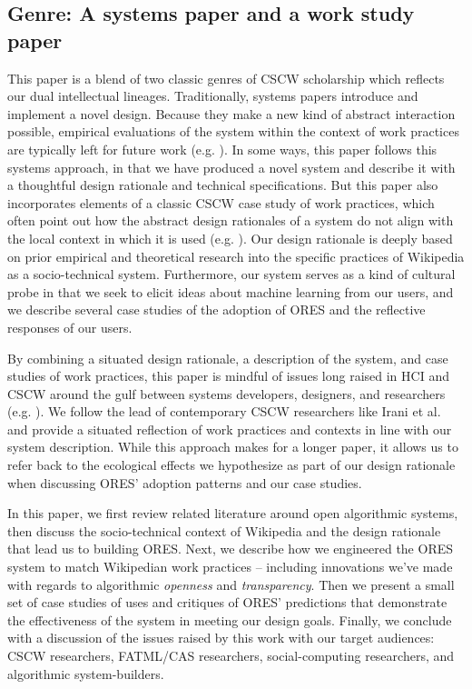 \subsection{Genre: A systems paper and a work study paper}
This paper is a blend of two classic genres of CSCW scholarship which reflects our dual intellectual lineages. Traditionally, systems papers introduce and implement a novel design. Because they make a new kind of abstract interaction possible, empirical evaluations of the system within the context of work practices are typically left for future work (e.g. \cite{resnick1994grouplens}). In some ways, this paper follows this systems approach, in that we have produced a novel system and describe it with a thoughtful design rationale and technical specifications. But this paper also incorporates elements of a classic CSCW case study of work practices, which often point out how the abstract design rationales of a system do not align with the local context in which it is used (e.g. \cite{star1994steps}). Our design rationale is deeply based on prior empirical and theoretical research into the specific practices of Wikipedia as a socio-technical system. Furthermore, our system serves as a kind of cultural probe in that we seek to elicit ideas about machine learning from our users, and we describe several case studies of the adoption of ORES and the reflective responses of our users.

By combining a situated design rationale, a description of the system, and case studies of work practices, this paper is mindful of issues long raised in HCI and CSCW around the gulf between systems developers, designers, and researchers (e.g. \cite{gentner1990good, dourish2006implications, grudin1988cscw}). We follow the lead of contemporary CSCW researchers like Irani et al.\cite{irani2013turkopticon} and provide a situated reflection of work practices and contexts in line with our system description. While this approach makes for a longer paper, it allows us to refer back to the ecological effects we hypothesize as part of our design rationale when discussing ORES' adoption patterns and our case studies.

In this paper, we first review related literature around open algorithmic systems, then discuss the socio-technical context of Wikipedia and the design rationale that lead us to building ORES.  Next, we describe how we engineered the ORES system to match Wikipedian work practices -- including innovations we've made with regards to algorithmic \emph{openness} and \emph{transparency}.  Then we present a small set of case studies of uses and critiques of ORES' predictions that demonstrate the effectiveness of the system in meeting our design goals.  Finally, we conclude with a discussion of the issues raised by this work with our target audiences: CSCW researchers, FATML/CAS researchers, social-computing researchers, and algorithmic system-builders.
